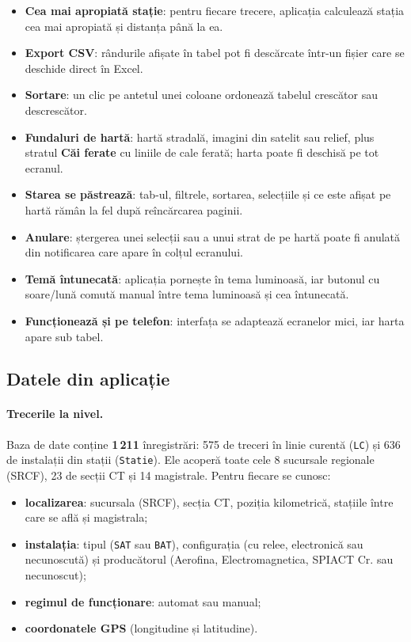 \documentclass[11pt,a4paper]{article}
\newcommand{\code}[1]{\texttt{#1}}
\newcommand{\ui}[1]{\textsf{\textbf{#1}}}
\begin{document}
\begin{itemize}
  \item \textbf{Cea mai apropiată stație}: pentru fiecare trecere, aplicația
        calculează stația cea mai apropiată și distanța până la ea.
  \item \textbf{Export CSV}: rândurile afișate în tabel pot fi descărcate
        într-un fișier care se deschide direct în Excel.
  \item \textbf{Sortare}: un clic pe antetul unei coloane ordonează tabelul
        crescător sau descrescător.
  \item \textbf{Fundaluri de hartă}: hartă stradală, imagini din satelit sau
        relief, plus stratul \ui{Căi ferate} cu liniile de cale ferată; harta
        poate fi deschisă pe tot ecranul.
  \item \textbf{Starea se păstrează}: tab-ul, filtrele, sortarea, selecțiile și
        ce este afișat pe hartă rămân la fel după reîncărcarea paginii.
  \item \textbf{Anulare}: ștergerea unei selecții sau a unui strat de pe hartă
        poate fi anulată din notificarea care apare în colțul ecranului.
  \item \textbf{Temă întunecată}: aplicația pornește în tema luminoasă,
        iar butonul cu soare/lună comută manual între tema luminoasă și cea
        întunecată.
  \item \textbf{Funcționează și pe telefon}: interfața se adaptează ecranelor
        mici, iar harta apare sub tabel.
\end{itemize}

\subsection{Datele din aplicație}

\paragraph{Trecerile la nivel.} Baza de date conține \textbf{1\,211}
înregistrări: 575 de treceri în linie curentă (\code{LC}) și 636 de
instalații din stații (\code{Statie}). Ele acoperă toate cele 8 sucursale
regionale (SRCF), 23 de secții CT și 14 magistrale. Pentru fiecare se
cunosc:

\begin{itemize}
  \item \textbf{localizarea}: sucursala (SRCF), secția CT, poziția
        kilometrică, stațiile între care se află și magistrala;
  \item \textbf{instalația}: tipul (\code{SAT} sau \code{BAT}), configurația
        (cu relee, electronică sau necunoscută) și producătorul (Aerofina,
        Electromagnetica, SPIACT Cr. sau necunoscut);
  \item \textbf{regimul de funcționare}: automat sau manual;
  \item \textbf{coordonatele GPS} (longitudine și latitudine).
\end{itemize}
\end{document}
